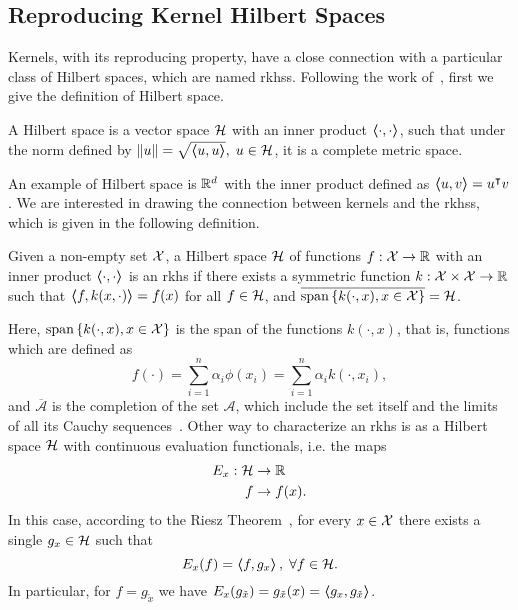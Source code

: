 \subsection{Reproducing Kernel Hilbert Spaces}
%
Kernels, with its reproducing property, have a close connection with a particular class of Hilbert spaces, which are named \acrfull{rkhss}. Following the work of~\citet{ScholkopfS02}, first we give the definition of Hilbert space.
%
\begin{definition}
    A Hilbert space is a vector space $\mathcal{H}$ with an inner product $\bm{\left\langle} \cdot, \cdot \bm{\right\rangle}$, such that under the norm defined by $\left\lVert u\right\rVert = \sqrt{\bm{\left\langle} u, u \bm{\right\rangle}}, \; u \in \mathcal{H}$, it is a complete metric space.
\end{definition}
%
An example of Hilbert space is $\mathbb{R}^d$ with the inner product defined as $\bm{\left\langle} u, v \bm{\right\rangle} = u^\intercal v$.
%
We are interested in drawing the connection between kernels and the \acrshort{rkhss}, which is given in the following definition.
\begin{definition}
    Given a non-empty set $\mathcal{X}$, a Hilbert space $\mathcal{H}$ of functions $f: \mathcal{X} \to \mathbb{R}$ with an inner product $\bm{\left\langle} \cdot, \cdot \bm{\right\rangle}$ is an \acrshort{rkhs} if there exists a symmetric function $k: \mathcal{X} \times \mathcal{X} \to \mathbb{R}$ such that $\bm{\left\langle} f, k(x, \cdot) \bm{\right\rangle} = f(x)$ for all $f \in \mathcal{H}$, and $\overline{\operatorname{span}{\left\{k(\cdot, x), x \in \mathcal{X}\right\}}} = \mathcal{H}$. 
\end{definition}
Here, $\operatorname{span}{\left\{k(\cdot, x), x \in \mathcal{X}\right\}}$ is the span of the functions $k(\cdot, x)$, that is, functions which are defined as
$$ f(\cdot) = \sum_{i=1}^n \alpha_i \phi(x_i) =\sum_{i=1}^n \alpha_i k(\cdot, x_i), $$
and $\overline{\mathcal{A}}$ is the completion of the set $\mathcal{A}$, which include the set itself and the limits of all its Cauchy sequences~\citep{kelley2017general}.
Other way to characterize an \acrshort{rkhs} is as a Hilbert space $\mathcal{H}$ with continuous evaluation functionals, i.e. the maps
\begin{equation}
            \begin{aligned}
        \nonumber
        E_{x}: \mathcal{H} &\to \mathbb{R} \\
        f &\to f(x) .
    \end{aligned}
\end{equation}
In this case, according to the Riesz Theorem~\citep{Whittaker1991ACI}, for every $x \in \mathcal{X}$ there exists a single $g_x \in \mathcal{H}$ such that
$$ E_x(f) = \bm{\left\langle} f, g_x \bm{\right\rangle}, \; \forall f \in \mathcal{H}.$$
In particular, for $f = g_{\tilde{x}}$ we have $E_x(g_{\tilde{x}}) = g_{{\tilde{x}}}(x) = \bm{\left\langle} g_x, g_{\tilde{x}} \bm{\right\rangle}$. 

